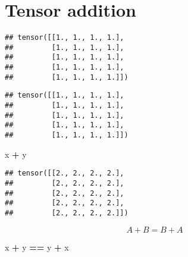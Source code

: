 \documentclass[]{book}
\newenvironment{Shaded}{\begin{snugshade}}{\end{snugshade}}
\newcommand{\DataTypeTok}[1]{\textcolor[rgb]{0.13,0.29,0.53}{#1}}
\newcommand{\KeywordTok}[1]{\textcolor[rgb]{0.13,0.29,0.53}{\textbf{#1}}}
\newcommand{\NormalTok}[1]{#1}
\newcommand{\OperatorTok}[1]{\textcolor[rgb]{0.81,0.36,0.00}{\textbf{#1}}}
\newcommand{\StringTok}[1]{\textcolor[rgb]{0.31,0.60,0.02}{#1}}
\begin{document}
\hypertarget{tensor-addition}{%
\section{Tensor addition}\label{tensor-addition}}

\begin{Shaded}
\end{Shaded}

\begin{verbatim}
## tensor([[1., 1., 1., 1.],
##         [1., 1., 1., 1.],
##         [1., 1., 1., 1.],
##         [1., 1., 1., 1.],
##         [1., 1., 1., 1.]])
\end{verbatim}

\begin{Shaded}
\end{Shaded}

\begin{verbatim}
## tensor([[1., 1., 1., 1.],
##         [1., 1., 1., 1.],
##         [1., 1., 1., 1.],
##         [1., 1., 1., 1.],
##         [1., 1., 1., 1.]])
\end{verbatim}

\begin{Shaded}
\begin{Highlighting}[]
\NormalTok{x }\OperatorTok{+}\StringTok{ }\NormalTok{y}
\end{Highlighting}
\end{Shaded}

\begin{verbatim}
## tensor([[2., 2., 2., 2.],
##         [2., 2., 2., 2.],
##         [2., 2., 2., 2.],
##         [2., 2., 2., 2.],
##         [2., 2., 2., 2.]])
\end{verbatim}

\[A + B = B + A\]

\begin{Shaded}
\begin{Highlighting}[]
\NormalTok{x }\OperatorTok{+}\StringTok{ }\NormalTok{y }\OperatorTok{==}\StringTok{ }\NormalTok{y }\OperatorTok{+}\StringTok{ }\NormalTok{x}
\end{Highlighting}
\end{Shaded}
\end{document}
